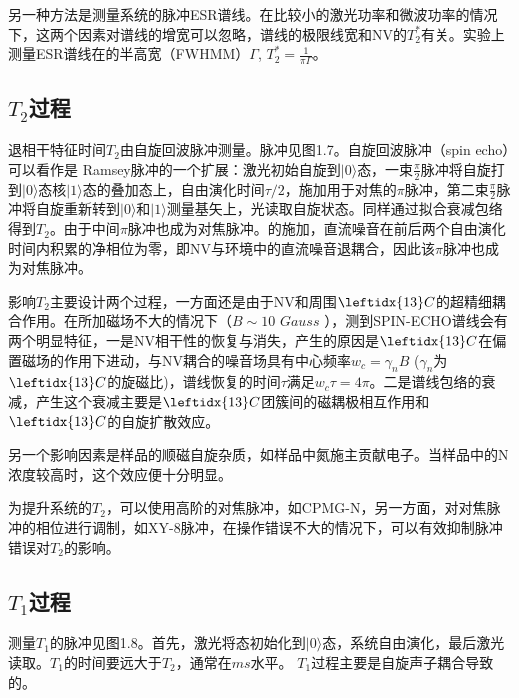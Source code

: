 另一种方法是测量系统的脉冲ESR谱线。在比较小的激光功率和微波功率的情况下，这两个因素对谱线的增宽可以忽略，谱线的极限线宽和NV的$T_2^*$有关。实验上测量ESR谱线在的半高宽（FWHMM）$\Gamma$, $T_2^*=\frac{1}{\pi \Gamma}$。

\subsection{$T_2$过程}
退相干特征时间$T_2$由自旋回波脉冲测量。脉冲见图1.7。自旋回波脉冲（spin echo）可以看作是 Ramsey脉冲的一个扩展：激光初始自旋到$|0\rangle$态，一束$\frac{\pi}{2}$脉冲将自旋打到$|0\rangle$态核$|1\rangle$态的叠加态上，自由演化时间$\tau/2$，施加用于对焦的$\pi$脉冲，第二束$\frac{\pi}{2}$脉冲将自旋重新转到$|0\rangle$和$|1\rangle$测量基矢上，光读取自旋状态。同样通过拟合衰减包络得到$T_2$。由于中间$\pi$脉冲也成为对焦脉冲。的施加，直流噪音在前后两个自由演化时间内积累的净相位为零，即NV与环境中的直流噪音退耦合，因此该$\pi$脉冲也成为对焦脉冲。

影响$T_2$主要设计两个过程，一方面还是由于NV和周围$\leftidx{13}C$的超精细耦合作用。在所加磁场不大的情况下（$B \sim 10$ $\si{Gauss}$ ），测到SPIN-ECHO谱线会有两个明显特征，一是NV相干性的恢复与消失，产生的原因是$\leftidx{13}C$在偏置磁场的作用下进动，与NV耦合的噪音场具有中心频率$w_c=\gamma_{n} B$ ($\gamma_{n}$为$\leftidx{13}C$的旋磁比)，谱线恢复的时间$\tau$满足$w_c \tau=4 \pi$。二是谱线包络的衰减，产生这个衰减主要是$\leftidx{13}C$团簇间的磁耦极相互作用和$\leftidx{13}C$的自旋扩散效应。

另一个影响因素是样品的顺磁自旋杂质，如样品中氮施主贡献电子。当样品中的N浓度较高时，这个效应便十分明显。

为提升系统的$T_2$，可以使用高阶的对焦脉冲，如CPMG-N，另一方面，对对焦脉冲的相位进行调制，如XY-8脉冲，在操作错误不大的情况下，可以有效抑制脉冲错误对$T_2$的影响。

\subsection{$T_1$过程}
测量$T_1$的脉冲见图1.8。首先，激光将态初始化到$|0\rangle$态，系统自由演化，最后激光读取。$T_1$的时间要远大于$T_2$，通常在$\si{ms}$水平。
$T_1$过程主要是自旋声子耦合导致的。

